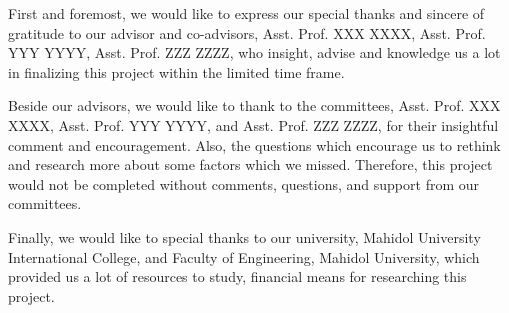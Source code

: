 First and foremost, we would like to express our special thanks and sincere of gratitude to our advisor and co-advisors, Asst. Prof. XXX XXXX, Asst. Prof. YYY YYYY, Asst. Prof. ZZZ ZZZZ, who insight, advise and knowledge us a lot in finalizing this project within the limited time frame.

Beside our advisors, we would like to thank to the committees, Asst. Prof. XXX XXXX, Asst. Prof. YYY YYYY, and Asst. Prof. ZZZ ZZZZ, for their insightful comment and encouragement. Also, the questions which encourage us to rethink and research more about some factors which we missed. Therefore, this project would not be completed without comments, questions, and support from our committees.

Finally, we would like to special thanks to our university, Mahidol University International College, and Faculty of Engineering, Mahidol University, which provided us a lot of resources to study, financial means for researching this project.